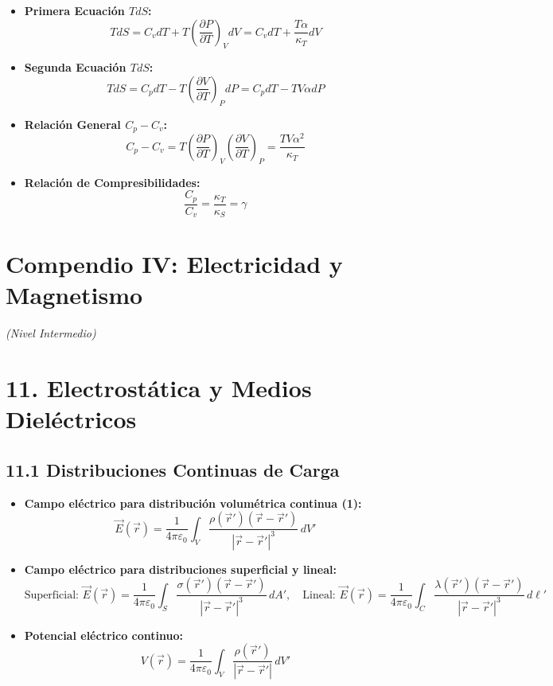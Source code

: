 \documentclass[11pt,a4paper]{article}
\begin{document}
\begin{itemize}
  \item \textbf{Primera Ecuación $T dS$:}
  \[
    T dS = C_v dT + T \left( \frac{\partial P}{\partial T} \right)_V dV = C_v dT + \frac{T \alpha}{\kappa_T} dV
  \]
  \item \textbf{Segunda Ecuación $T dS$:}
  \[
    T dS = C_p dT - T \left( \frac{\partial V}{\partial T} \right)_P dP = C_p dT - T V \alpha dP
  \]
  \item \textbf{Relación General $C_p - C_v$:}
  \[
    C_p - C_v = T \left( \frac{\partial P}{\partial T} \right)_V \left( \frac{\partial V}{\partial T} \right)_P = \frac{T V \alpha^2}{\kappa_T}
  \]
  \item \textbf{Relación de Compresibilidades:}
  \[
    \frac{C_p}{C_v} = \frac{\kappa_T}{\kappa_S} = \gamma
  \]
\end{itemize}

\section*{Compendio IV: Electricidad y Magnetismo}

\textit{(Nivel Intermedio)}

\section*{11. Electrostática y Medios Dieléctricos}

\subsection*{11.1 Distribuciones Continuas de Carga}

\begin{itemize}
  \item \textbf{Campo eléctrico para distribución volumétrica continua (1):}
  \[
    \vec{E}(\vec{r}) = \frac{1}{4\pi\varepsilon_0} \int_V \frac{\rho(\vec{r}')(\vec{r} - \vec{r}')}{|\vec{r} - \vec{r}'|^3} \, dV'
  \]
  \item \textbf{Campo eléctrico para distribuciones superficial y lineal:}
  \[
    \text{Superficial: } \vec{E}(\vec{r}) = \frac{1}{4\pi\varepsilon_0} \int_S \frac{\sigma(\vec{r}')(\vec{r} - \vec{r}')}{|\vec{r} - \vec{r}'|^3} \, dA', \quad \text{Lineal: } \vec{E}(\vec{r}) = \frac{1}{4\pi\varepsilon_0} \int_C \frac{\lambda(\vec{r}')(\vec{r} - \vec{r}')}{|\vec{r} - \vec{r}'|^3} \, d\ell'
  \]
  \item \textbf{Potencial eléctrico continuo:}
  \[
    V(\vec{r}) = \frac{1}{4\pi\varepsilon_0} \int_V \frac{\rho(\vec{r}')}{|\vec{r} - \vec{r}'|} \, dV'
  \]
\end{itemize}
\end{document}
